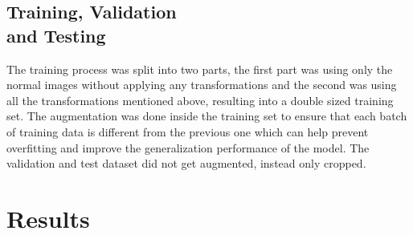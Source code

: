 \documentclass{article}
\begin{document}
\begin{multicols}{2}
\subsection{Training, Validation \\and Testing}
The training process was split into two parts, the first part was using only the normal images without applying any transformations and the second was using all 
the transformations mentioned above, resulting into a double sized training set. The augmentation was done inside the training set to  ensure that each batch of training data is different from the previous one
which can help prevent overfitting and improve the generalization performance of the model. The validation and test dataset did not get augmented, instead only cropped.

\section{Results}

\end{multicols}
\end{document}
